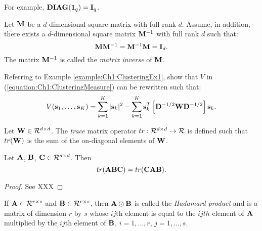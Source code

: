 For example, ${\bf DIAG}({\bf 1}_q) = {\bf I}_q$.

\begin{definition}
Let ${\bf M}$ be a $d$-dimensional square matrix with full rank $d$.
Assume, in addition, there exists a $d$-dimensional square matrix ${\bf M}^{-1}$ 
with full rank $d$ such that:
\begin{displaymath}
{\bf M} {\bf M}^{-1} = {\bf M}^{-1} {\bf M} = {\bf I}_d.
\end{displaymath}
The matrix ${\bf M}^{-1}$ is called the {\em matrix inverse} of ${\bf M}$. 
\end{definition}

\begin{example}
Referring to Example \ref{example:Ch1:ClusteringEx1},
show that $V$ in (\ref{equation:Ch1:ClusteringMeasure}) can be rewritten such that:
\begin{equation}
\label{equation:Ch4:ClusteringMeasure}
V({\bf s}_1, \ldots, {\bf s}_K) = \sum_{k=1}^K |{\bf s}_k|^2  - 
\sum_{k=1}^K {\bf s}_k^T \left[{\bf D}^{-1/2} {\bf W} {\bf D}^{-1/2} \right] {\bf s}_k.
\end{equation}
\end{example}

\begin{definition}
Let ${\bf W} \in {\cal R}^{d \times d}$.
The {\em trace} matrix operator $tr : {\cal R}^{d \times d} \rightarrow {\cal R}$
is defined such that $tr({\bf W})$ is the sum of the on-diagonal elements
of ${\bf W}$.
\end{definition}

\begin{theorem}
\label{Ch4:Theorem:CyclicTrace}
Let ${\bf A}$, ${\bf B}$, ${\bf C} \in {\cal R}^{d \times d}$. Then
\begin{displaymath}
tr({\bf A}{\bf B}{\bf C}) = tr({\bf C}{\bf A}{\bf B}).
\end{displaymath}
\end{theorem}

\begin{proof}
See XXX
\end{proof}

\begin{definition}
If ${\bf A} \in {\cal R}^{r \times s}$ and ${\bf B} \in {\cal R}^{r \times s}$,
then ${\bf A} \odot {\bf B}$ is called the {\em Hadamard product} and is a
matrix of dimension $r$ by $s$ whose $ij$th element is equal to the $ijth$
element of ${\bf A}$ multiplied by the $ij$th element of ${\bf B}$, $i = 1, \ldots, r$,
$j = 1, \ldots, s$.
\end{definition}

